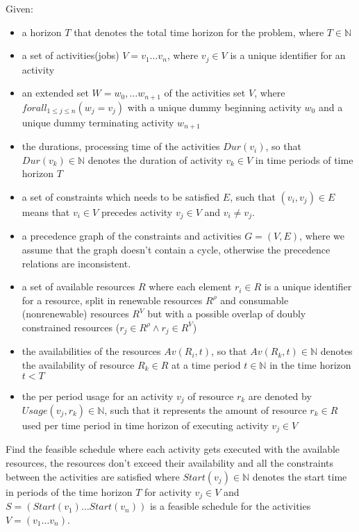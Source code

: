 \documentclass{article}
\begin{document}
Given:
\begin{itemize}
\item a horizon $T$ that denotes the total time horizon for the problem, where $T \in \mathbb{N}$
\item a set of activities(jobs) $V = v_1 \ldots v_n$, where $v_j \in V$ is a unique identifier for an activity
\item an extended set $W = w_0, \ldots w_{n+1}$ of the activities set $V$, where $forall_{1 \leq j \leq n}(w_j = v_j)$ with a unique dummy beginning activity $w_0$ and a unique dummy terminating activity $w_{n+1}$
\item the durations, processing time of the activities $Dur(v_i)$, so that $Dur(v_k) \in \mathbb{N}$ denotes the duration of activity $v_k \in V$ in time periods of time horizon $T$
\item a set of constraints which needs to be satisfied $E$, such that $(v_i,v_j) \in E$ means that $v_i \in V$ precedes activity $v_j \in V$ and $v_i \neq v_j$.
\item a precedence graph of the constraints and activities $G = (V, E)$, where we assume that the graph doesn't contain a cycle, otherwise the precedence relations are inconsistent.
\item a set of available resources $R$ where each element $r_i \in R$ is a unique identifier for a resource, split in renewable resources $R^{\rho}$ and  consumable (nonrenewable) resources $R^V$ but with a possible overlap of doubly constrained resources ($r_j \in R^{\rho} \wedge r_j \in R^V$)
\item the availabilities of the resources $Av(R_i, t)$, so that $Av(R_k, t) \in \mathbb{N}$ denotes the availability of resource $R_k \in R$ at a time period $t \in \mathbb{N}$ in the time horizon $t < T$
\item the per period usage for an activity $v_j$ of resource $r_k$ are denoted by $Usage(v_j, r_k) \in \mathbb{N}$, such that it represents the amount of resource $r_k \in R$ used per time period in time horizon of executing activity $v_j \in V$
\end{itemize}

Find the feasible schedule where each activity gets executed with the available resources, the resources don't exceed their availability and all the constraints between the activities are satisfied where $Start(v_j) \in \mathbb{N}$ denotes the start time in periods of the time horizon $T$ for activity $v_j \in V$ and
$S = (Start(v_1) \ldots Start(v_n))$ is a feasible schedule for the activities $V = (v_1 \ldots v_n)$.
\end{document}
